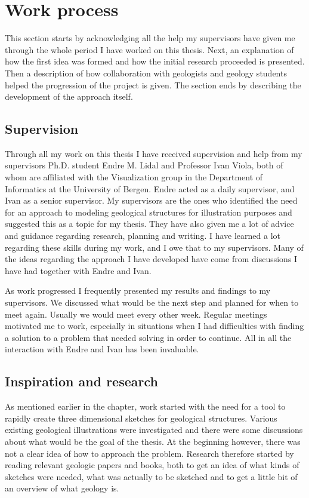 \documentclass[a4paper,12pt]{report}
\begin{document}
\section{Work process}
\label{subsec:work}
This section starts by acknowledging all the help my supervisors have given me through the whole period I have worked on this thesis. Next, an explanation of how the first idea was formed and how the initial research proceeded is presented. Then a description of how collaboration with geologists and geology students helped the progression of the project is given. The section ends by describing the development of the approach itself.

\subsection{Supervision}
Through all my work on this thesis I have received supervision and help from my supervisors Ph.D. student Endre M. Lidal and Professor Ivan Viola, both of whom are affiliated with the Visualization group in the Department of Informatics at the University of Bergen. Endre acted as a daily supervisor, and Ivan as a senior supervisor. My supervisors are the ones who identified the need for an approach to modeling geological structures for illustration purposes and suggested this as a topic for my thesis. They have also given me a lot of advice and guidance regarding research, planning and writing. I have learned a lot regarding these skills during my work, and I owe that to my supervisors. Many of the ideas regarding the approach I have developed have come from discussions I have had together with Endre and Ivan.

As work progressed I frequently presented my results and findings to my supervisors. We discussed what would be the next step and planned for when to meet again. Usually we would meet every other week. Regular meetings motivated me to work, especially in situations when I had difficulties with finding a solution to a problem that needed solving in order to continue. All in all the interaction with Endre and Ivan has been invaluable.


\subsection{Inspiration and research}
As mentioned earlier in the chapter, work started with the need for a tool to rapidly create three dimensional sketches for geological structures. Various existing geological illustrations were investigated and there were some discussions about what would be the goal of the thesis. At the beginning however, there was not a clear idea of how to approach the problem. Research therefore started by reading  relevant geologic papers and books, both to get an idea of what kinds of sketches were needed, what was actually to be sketched and to get a little bit of an overview of what geology is.
\end{document}
